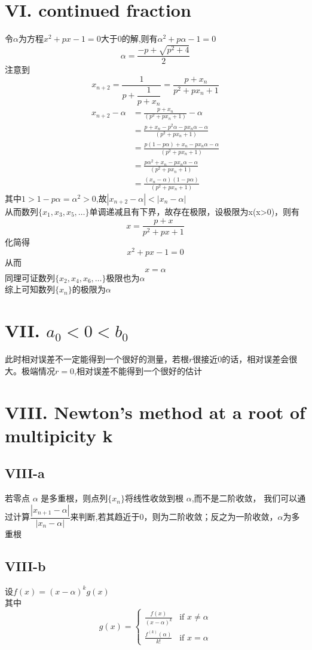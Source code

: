 \documentclass[a4paper]{article}
\begin{document}
\section*{VI. continued fraction}
令$\alpha$为方程$x^2 + px -1 = 0$大于0的解,则有$\alpha^2 + p\alpha -1 = 0$\\
\[\alpha =  \frac{-p + \sqrt{p^2+4}}{2}
\]
注意到
\[
x_{n+2} = \frac{1}{p + \dfrac{1}{p + x_n}}= \frac{p + x_n}{p^2 + px_n + 1}
\]
\begin{align*}
  x_{n+2} - \alpha &= \frac{p + x_n}{\left(p^2 + px_n + 1\right)} - \alpha \\
  &= \frac{p + x_n - p^2\alpha - px_n\alpha - \alpha}{\left(p^2 + px_n + 1\right)}\\
  &= \frac{p(1 - p\alpha) + x_n- px_n\alpha - \alpha}{\left(p^2 + px_n + 1\right)}\\
  &= \frac{p\alpha^2 + x_n- px_n\alpha - \alpha}{\left(p^2 + px_n + 1\right)}\\
  &= \frac{(x_n - \alpha)(1-p\alpha)}{\left(p^2 + px_n + 1\right)}  
\end{align*}
其中$1 > 1 - p\alpha = \alpha^2 > 0$,故$|x_{n+2} - \alpha| < |x_n - \alpha|$\\
从而数列$\{x_1, x_3, x_5, \dots \}$单调递减且有下界，故存在极限，设极限为x(x>0)，则有
\[
  x = \frac{p + x}{p^2 + px + 1}
\]
化简得
\[
  x^2 + px -1 = 0
\]
从而\[x = \alpha\]
同理可证数列$\{x_2, x_4, x_6, \dots \}$极限也为$\alpha$\\
综上可知数列$\{x_n\}$的极限为$\alpha$

\section*{VII. $a_0 < 0 < b_0$}
此时相对误差不一定能得到一个很好的测量，若根$r$很接近0的话，相对误差会很大。极端情况$r = 0$,相对误差不能得到一个很好的估计 

\section*{VIII. Newton's method at a root of multipicity k}
\subsection*{VIII-a}
若零点 $\alpha$ 是多重根，则点列$\{x_n\}$将线性收敛到根 $\alpha$,而不是二阶收敛，
我们可以通过计算$\dfrac{|x_{n+1} - \alpha|}{|x_n - \alpha|}$来判断,若其趋近于0，则为二阶收敛；反之为一阶收敛，$\alpha$为多重根

\subsection*{VIII-b}
设$f(x) = (x - \alpha)^k g(x)$\\
其中\[g(x)=
\begin{cases}
  \frac{f(x)}{(x-\alpha)^k} &\text{if } x \neq \alpha\\
  \frac{f^{(k)}(\alpha)}{k!}&\text{if } x = \alpha
\end{cases}
\] 
\end{document}

